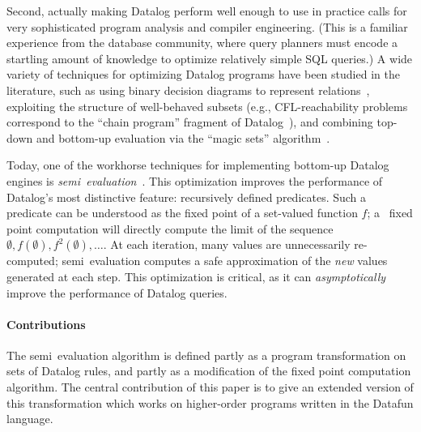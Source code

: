 Second, actually
making Datalog perform well enough to use in practice calls for very
sophisticated program analysis and compiler engineering. (This is a
familiar experience from the database community, where query planners
must encode a startling amount of knowledge to optimize relatively
simple SQL queries.) A wide variety of techniques for optimizing
Datalog programs have been studied in the literature, such as using
binary decision diagrams to represent relations~\cite{whaley-phd},
exploiting the structure of well-behaved subsets (e.g.,
CFL-reachability problems correspond to the ``chain program'' fragment
of Datalog~\cite{chain-programs}), and combining top-down and
bottom-up evaluation via the ``magic sets''
algorithm~\cite{magic-sets}.

Today, one of the workhorse techniques for implementing bottom-up
Datalog engines is \emph{semi\naive\
  evaluation}~\cite{seminaive}. This optimization improves the
performance of Datalog's most distinctive feature: recursively defined
predicates. Such a predicate can be understood as the fixed point of a
set-valued function $f$; a \naive\ fixed point computation will
directly compute the limit of the sequence
$\emptyset, f(\emptyset), f^2(\emptyset), \dots$. At each iteration,
many values are unnecessarily re-computed; semi\naive\ evaluation
computes a safe approximation of the \emph{new} values generated at
each step. This optimization is critical, as it can
\emph{asymptotically} improve the performance of Datalog queries.


\paragraph{Contributions} The semi\naive\ evaluation algorithm is
defined partly as a program transformation on sets of Datalog rules,
and partly as a modification of the fixed point computation algorithm.
The central contribution of this paper is to give an extended version
of this transformation which works on higher-order programs written
in the Datafun language. 

